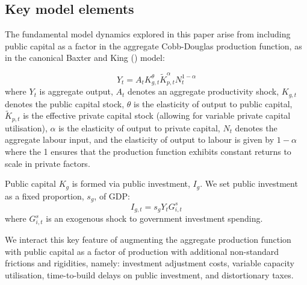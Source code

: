 \documentclass[titlepage, 11pt, a4paper]{article}
\renewcommand{\&}{and}
\begin{document}
\subsection{Key model elements}
The fundamental model dynamics explored in this paper arise from including public capital as a factor in the aggregate Cobb-Douglas production function, as in the canonical Baxter and King (\citeyear{baxter1993fiscal}) model:   


    \begin{equation} \label{agg_prod_fn} 
    Y_t= A_t K_{g,t}^{\theta}\tilde{K}_{p,t}^{\alpha}N_t^{1-\alpha}
\end{equation}
where $Y_t$ is aggregate output, $A_t$ denotes an aggregate productivity shock, 
$K_{g,t}$ denotes the public capital stock, $\theta$ is the elasticity of output to public capital, 
$\tilde{K}_{p,t}$ is the effective private capital stock (allowing for variable private capital utilisation), $\alpha$ is the elasticity of output to private capital, $N_t$ denotes the aggregate labour input, and the elasticity of output to labour is given by $1-\alpha$ where the 1 ensures that the production function exhibits constant returns to scale in private factors. 

Public capital $K_g$ is formed via public investment, $I_g$. We set public investment as a fixed proportion, $s_g$, of GDP: 
\begin{equation}
    I_{g,t} = s_gY_tG^s_{i,t}
\end{equation}
where $G^s_{i,t}$ is an exogenous shock to government investment spending.


We interact this key feature of augmenting the aggregate production function with public capital as a factor of production with additional non-standard frictions and rigidities, namely: investment adjustment costs, variable capacity utilisation, time-to-build delays on public investment, and distortionary taxes. 
\end{document}
